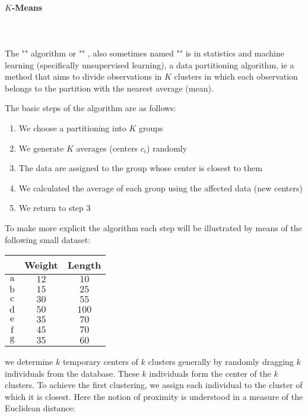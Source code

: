 	\paragraph{$K$-Means}\mbox{}\\\\
	The "" algorithm or "" , also sometimes named "" is in statistics and machine learning (specifically unsupervised learning), a data partitioning algorithm, ie a method that aims to divide observations in $K$ clusters in which each observation belongs to the partition with the nearest average (mean).

	The basic steps of the algorithm are as follows:
	\begin{enumerate}
		\item We choose a partitioning into $K$ groups

		\item We generate $K$ averages (centers $c_i$) randomly

		\item  The data are assigned to the group whose center is closest to them

		\item We calculated the average of each group using the affected data (new centers)

		\item We return to step 3
	\end{enumerate}	
	To make more explicit the algorithm each step will be illustrated by means of the following small dataset:
	\begin{table}[H]
		\centering
		\begin{tabular}{|c|c|c|}
		\hline
		\rowcolor[HTML]{9B9B9B} 
		\multicolumn{1}{|l|}{\cellcolor[HTML]{9B9B9B}\textbf{Object}} & \multicolumn{1}{l|}{\cellcolor[HTML]{9B9B9B}\textbf{Weight}} & \multicolumn{1}{l|}{\cellcolor[HTML]{9B9B9B}\textbf{Length}} \\ \hline
		$\mathrm{a}$ & $12$ & $10$ \\ \hline
		$\mathrm{b}$ & $15$ & $25$ \\ \hline
		$\mathrm{c}$ & $30$ & $55$ \\ \hline
		$\mathrm{d}$ & $50$ & $100$ \\ \hline
		$\mathrm{e}$ & $35$ & $70$ \\ \hline
		$\mathrm{f}$ & $45$ & $70$ \\ \hline
		$\mathrm{g}$ & $35$ & $60$ \\ \hline
		\end{tabular}
	\end{table}
	we determine $k$ temporary centers of $k$ clusters generally by randomly dragging $k$ individuals from the database. These $k$ individuals form the center of the $k$ clusters. To achieve the first clustering, we assign each individual to the cluster of which it is closest. Here the notion of proximity is understood in a measure of the Euclidean distance:
	
